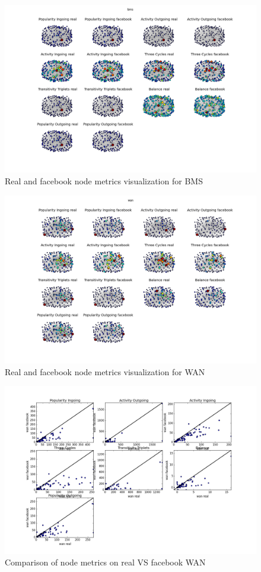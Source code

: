 \documentclass[journal]{IEEEtran}
\begin{document}
\begin{figure}[!htb]
\centering
\includegraphics[scale=.55]{bms_both}
\caption{Real and facebook node metrics visualization for BMS}
\end{figure}


\begin{figure}[!htb]
\centering
\includegraphics[scale=.55]{wan_both}
\caption{Real and facebook node metrics visualization for WAN}
\end{figure}

\begin{figure}[!htb]
\centering
\includegraphics[scale=.55]{wan}
\caption{Comparison of node metrics on real VS facebook WAN}
\end{figure}
\end{document}
